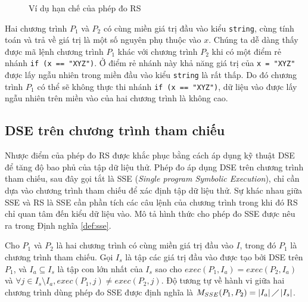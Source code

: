 \begin{figure}[h]
	\centering
	\caption{Ví dụ hạn chế của phép đo RS}
	\label{fig:Hanche-RS}
	\begin{minipage}[t]{0.45\linewidth}
		
	\end{minipage}%
	\hfill\vrule\hfill
	\begin{minipage}[t]{0.45\linewidth}
		
	\end{minipage}%
\end{figure}

Hai chương trình $P_{1}$ và $P_{2}$ có cùng miền giá trị đầu vào kiểu \texttt{string}, cùng tính toán và trả về giá trị là một số nguyên phụ thuộc vào $ x $. Chúng ta dễ dàng thấy được mã lệnh chương trình $P_{1}$ khác với chương trình $P_{2}$ khi có một điểm rẻ nhánh \texttt{if (x == "XYZ")}. Ở điểm rẻ nhánh này khả năng giá trị của \texttt{x = "XYZ"} được lấy ngẫu nhiên trong miền đầu vào kiểu \texttt{string} là rất thấp. Do đó chương trình $P_{1}$ có thể sẽ không thực thi nhánh \texttt{if (x == "XYZ")}, dữ liệu vào được lấy ngẫu nhiên trên miền vào của hai chương trình là không cao.

\subsection{DSE trên chương trình tham chiếu}

Nhược điểm của phép đo RS được khắc phục bằng cách áp dụng kỹ thuật
DSE để tăng độ bao phủ của tập dữ liệu thử. Phép đo áp dụng DSE trên
chương trình tham chiếu, sau đây gọi tắt là SSE (\emph{Single program
  Symbolic Execution}), chỉ cần dựa vào chương trình tham chiếu để xác
định tập dữ liệu thử. Sự khác nhau giữa SSE và RS là SSE cần phần tích
các câu lệnh của chương trình trong khi đó RS chỉ quan tâm đến kiểu dữ
liệu vào. Mô tả hình thức cho phép đo SSE được nêu ra trong Định nghĩa
\ref{def:sse}.

\begin{definition}
  \label{def:sse}
  Cho $P_{1}$ và $P_{2}$ là hai chương trình có cùng miền giá trị đầu
  vào $I$, trong đó $P_{1}$ là chương trình tham chiếu. Gọi $I_{s}$ là
  tập các giá trị đầu vào được tạo bởi DSE trên $P_{1}$, và
  $I_{a} \subseteq I_s$ là tập con lớn nhất của $I_{s}$ sao cho
  $exec(P_{1}, I_a) = exec(P_{2}, I_a)$ và
  $\forall j \in I_{s} \setminus I_{a}, exec(P_{1}, j) \neq
  exec(P_{2}, j)$. Độ tương tự về hành vi giữa hai chương trình dùng
  phép đo SSE được định nghĩa là
  $M_{SSE}(P_{1}, P_{2}) = \left|I_{a}\right| \diagup
  \left|I_{s}\right| $.
\end{definition}

